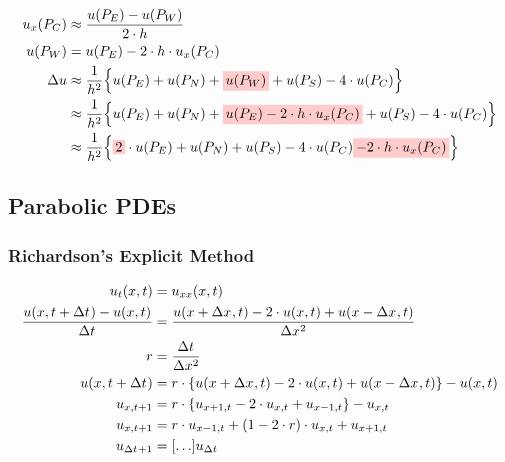 \documentclass[
	final,
	a4paper,
	oneside,
	parskip=full,
	headings=standardclasses,
	headings=big,
	pointednumbers,
    fleqn
]{scrartcl}
\newcommand{\tfillr}[1]{\tfillc[#1][red!20]}
\newcommand{\f}[2]{\frac{#1}{#2}}
\newcommand{\kl}[1]{{\left( #1 \right)}}
\newcommand{\kq}[1]{{\left\{ #1 \right\}}}
\newcommand{\ks}[1]{{\left[ #1 \right]}}
\begin{document}
    \begin{align*}
        u_x\kl{P_C} & \approx \f{u\kl{P_E} - u\kl{P_W}}{2\cdot h} \\
        u\kl{P_W}   & = u\kl{P_E} - 2\cdot h \cdot u_x\kl{P_C} \\
        \Delta u    & \approx \f{1}{h^2} \kq{u\kl{P_E} + u\kl{P_N} + \tfillr{$u\kl{P_W}$} + u\kl{P_S} - 4 \cdot u\kl{P_C}} \\
                    & \approx \f{1}{h^2} \kq{u\kl{P_E} + u\kl{P_N} + \tfillr{$u\kl{P_E} - 2\cdot h \cdot u_x\kl{P_C}$} + u\kl{P_S} - 4 \cdot u\kl{P_C}} \\
                    & \approx \f{1}{h^2} \kq{\tfillr{$2$} \cdot u\kl{P_E} + u\kl{P_N} + u\kl{P_S} - 4 \cdot u\kl{P_C} \tfillr{$- 2\cdot h \cdot u_x\kl{P_C}$}} \\
    \end{align*}
    
    \subsection*{Parabolic PDEs}
    \subsubsection*{Richardson's Explicit Method}
    
    \begin{align*}
        u_{t}\kl{x,t}                               & = u_{xx}\kl{x,t} \\
        \f{u \kl{x, t + \dt} - u \kl{x, t}}{\dt}    & = \f{u \kl{x + \dx, t} - 2 \cdot u\kl{x, t} + u \kl{x - \dx, t}}{\dx[2]} \\
        r                                           & = \f{\dt}{\dx[2]} \\
        u \kl{x, t + \dt}                           & = r \cdot \kq{u \kl{x + \dx, t} - 2 \cdot u\kl{x, t} + u \kl{x - \dx, t}} - u \kl{x, t} \\
        u_{x,t+1}                                   & = r \cdot \kq{u_{x+1,t} - 2 \cdot u_{x,t} + u_{x-1,t}} - u_{x, t} \\
        u_{x,t+1}                                   & = r \cdot u_{x-1,t} + \kl{1 - 2\cdot r} \cdot u_{x,t} + u_{x+1,t} \\
        u_{\dt + 1} & = \ks{\ldots}  u_{\dt}
    \end{align*}


    \newpage
\end{document}
